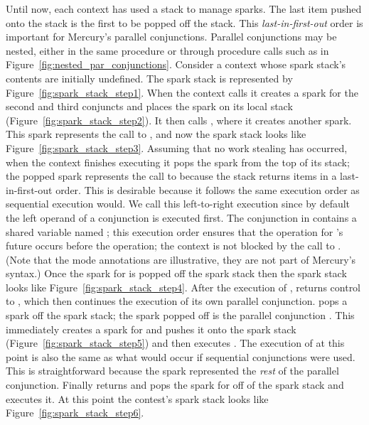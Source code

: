 Until now, each context has used a stack to manage sparks.
The last item pushed onto the stack is the first to be popped off the
stack.
This \emph{last-in-first-out} order is important for Mercury's parallel
conjunctions.
Parallel conjunctions may be nested, either in the same procedure or through
procedure calls such as in
Figure~\ref{fig:nested_par_conjunctions}.
Consider a context whose spark stack's contents are initially undefined.
The spark stack is represented by
Figure~\ref{fig:spark_stack_step1}.
When the context calls  it creates a spark
for the second and third conjuncts 
and places the spark on its local stack
(Figure~\ref{fig:spark_stack_step2}).
It then calls , where it creates another spark.
This spark represents the call to ,
and now the spark stack looks like
Figure~\ref{fig:spark_stack_step3}.
Assuming that no work stealing has occurred,
when the context finishes executing  it pops the spark from the top
of its stack;
the popped spark represents the call to  because
the stack returns items in a last-in-first-out order.
This is desirable because it follows the same execution order as sequential
execution would.
We call this left-to-right execution since by default the left operand of a
conjunction is executed first.
The conjunction in  contains a shared variable named ;
this execution order ensures that the \signal operation for 's future
occurs before the \wait operation;
the context is not blocked by the call to \wait.
(Note that the mode annotations are illustrative,
they are not part of Mercury's syntax.)
Once the spark for  is popped off the spark stack then the spark
stack looks like Figure~\ref{fig:spark_stack_step4}.
After the execution of ,  returns control to ,
which then continues the execution of its own parallel conjunction.
 pops a spark off the spark stack;
the spark popped off is the parallel conjunction
.
This immediately creates a spark for  and pushes it onto the spark
stack (Figure~\ref{fig:spark_stack_step5}) and
then executes .
The execution of  at this point is also the same as what would occur
if sequential conjunctions were used.
This is straightforward because
the spark represented the \emph{rest} of the parallel
conjunction.
Finally  returns and  pops the spark for  off of the
spark stack and executes it.
At this point the contest's spark stack looks like
Figure~\ref{fig:spark_stack_step6}.

